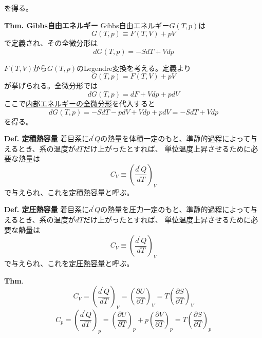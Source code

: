 \documentclass{jsarticle}
\begin{document}
を得る。\\
\hypertarget{Gibbs自由エネルギー}{}
\begin{itembox}[l]{\textbf{Thm. Gibbs自由エネルギー}}
    Gibbs自由エネルギー\(G(T,p)\)は
    \begin{equation*}
        G(T,p)\equiv F(T,V)+pV
    \end{equation*}
    で定義され、その全微分形は
    \begin{equation*}
        dG(T,p)=-SdT+Vdp
    \end{equation*}
\end{itembox}
\(F(T,V)\)から\(G(T,p)\)のLegendre変換を考える。定義より
\begin{equation*}
    G(T,p)=F(T,V)+pV
\end{equation*}
が挙げられる。全微分形では
\begin{equation*}
    dG(T,p)=dF+Vdp+pdV
\end{equation*}
ここで\hyperlink{内部エネルギーの全微分形}{内部エネルギーの全微分形}を代入すると
\begin{equation*}
    dG(T,p)=-SdT-pdV+Vdp+pdV=-SdT+Vdp
\end{equation*}
を得る。\\
\hypertarget{定積熱容量}{}
\begin{itembox}[l]{\textbf{Def. 定積熱容量}}
    着目系に\(d^{\prime}Q\)の熱量を体積一定のもと、準静的過程によって与えるとき、系の温度が\(dT\)だけ上がったとすれば、
    単位温度上昇させるために必要な熱量は
    \begin{equation*}
        C_{V}\equiv\left(\frac{d^{\prime}Q}{dT}\right)_{V}
    \end{equation*}
    で与えられ、これを\underline{定積熱容量}と呼ぶ。
\end{itembox}
\hypertarget{定圧熱容量}{}
\begin{itembox}[l]{\textbf{Def. 定圧熱容量}}
    着目系に\(d^{\prime}Q\)の熱量を圧力一定のもと、準静的過程によって与えるとき、系の温度が\(dT\)だけ上がったとすれば、
    単位温度上昇させるために必要な熱量は
    \begin{equation*}
        C_{V}\equiv\left(\frac{d^{\prime}Q}{dT}\right)_{V}
    \end{equation*}
    で与えられ、これを\underline{定圧熱容量}と呼ぶ。
\end{itembox}
\begin{itembox}[l]{\textbf{Thm}.}
    \begin{equation*}
        C_{V}=\left(\frac{d^{\prime}Q}{dT}\right)_{V}=\left(\frac{\partial U}{\partial T}\right)_{V}=T\left(\frac{\partial S}{\partial T}\right)_{V}
    \end{equation*}
    \begin{equation*}
        C_{p}=\left(\frac{d^{\prime}Q}{dT}\right)_{p}=\left(\frac{\partial U}{\partial T}\right)_{p}+p\left(\frac{\partial V}{\partial T}\right)_{p}
        =T\left(\frac{\partial S}{\partial T}\right)_{p}
    \end{equation*}
\end{itembox}
\end{document}
